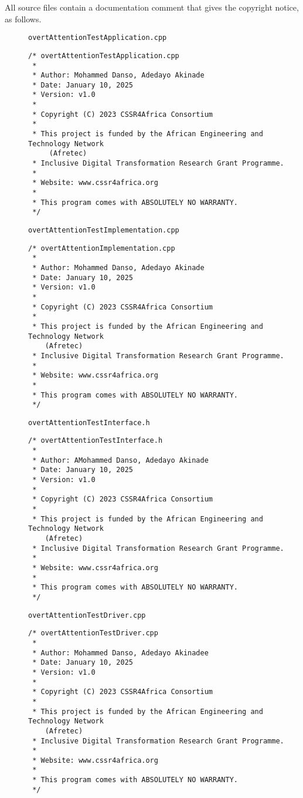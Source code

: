 \documentclass{CSSRforAfrica}
\newcommand{\blank}{~\\}
\newcommand{\checkboxChecked}{\fbox{\ding{51}}} %
\begin{document}
\noindent All source files contain a documentation comment that gives the copyright notice, as follows.
 
\begin{description}

\item[\checkboxChecked] {\small \verb+overtAttentionTestApplication.cpp+}  
{\small \begin{verbatim}
/* overtAttentionTestApplication.cpp
 *
 * Author: Mohammed Danso, Adedayo Akinade
 * Date: January 10, 2025
 * Version: v1.0
 * 
 * Copyright (C) 2023 CSSR4Africa Consortium
 * 
 * This project is funded by the African Engineering and Technology Network 
     (Afretec) 
 * Inclusive Digital Transformation Research Grant Programme. 
 *
 * Website: www.cssr4africa.org
 *
 * This program comes with ABSOLUTELY NO WARRANTY.
 */
\end{verbatim} }

\item[\checkboxChecked]  {\small \verb+overtAttentionTestImplementation.cpp+}  
{\small \begin{verbatim}
/* overtAttentionImplementation.cpp
 *
 * Author: Mohammed Danso, Adedayo Akinade
 * Date: January 10, 2025
 * Version: v1.0
 * 
 * Copyright (C) 2023 CSSR4Africa Consortium
 * 
 * This project is funded by the African Engineering and Technology Network
    (Afretec) 
 * Inclusive Digital Transformation Research Grant Programme. 
 *
 * Website: www.cssr4africa.org
 *
 * This program comes with ABSOLUTELY NO WARRANTY.
 */
\end{verbatim} }


\newpage
\item[\checkboxChecked] {\small \verb+overtAttentionTestInterface.h+}   
{\small \begin{verbatim}
/* overtAttentionTestInterface.h
 *
 * Author: AMohammed Danso, Adedayo Akinade
 * Date: January 10, 2025
 * Version: v1.0
 * 
 * Copyright (C) 2023 CSSR4Africa Consortium
 * 
 * This project is funded by the African Engineering and Technology Network
    (Afretec) 
 * Inclusive Digital Transformation Research Grant Programme. 
 *
 * Website: www.cssr4africa.org
 *
 * This program comes with ABSOLUTELY NO WARRANTY.
 */
\end{verbatim} }

\item[\checkboxChecked] {\small \verb+overtAttentionTestDriver.cpp+}  
{\small \begin{verbatim}
/* overtAttentionTestDriver.cpp
 *
 * Author: Mohammed Danso, Adedayo Akinadee
 * Date: January 10, 2025
 * Version: v1.0
 * 
 * Copyright (C) 2023 CSSR4Africa Consortium
 * 
 * This project is funded by the African Engineering and Technology Network
    (Afretec) 
 * Inclusive Digital Transformation Research Grant Programme. 
 *
 * Website: www.cssr4africa.org
 *
 * This program comes with ABSOLUTELY NO WARRANTY.
 */
\end{verbatim} }

\end{description} 
%
\end{document}
